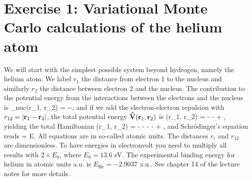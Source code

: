 \section*{Exercise 1: Variational Monte Carlo calculations of the helium atom}

We will start with the simplest possible system beyond hydrogen, namely the helium atom. We label $r_1$ the distance from electron 1 to the nucleus and similarly $r_2$ the distance between electron 2 and the nucleus. The contribution to the potential energy from the interactions between the 
electrons and the nucleus is
\be
   _{nuc}(\vec r_1, \vec r_2) 
   = 
   --,
\ee 
and if we add the electron-electron repulsion with $r_{12}=|{\bf r}_1-{\bf r}_2|$, the total potential energy  ${\bf\widehat{V}}(\mathbf r_1, \mathbf r_2)$ is
\be
 (\vec r_1, \vec r_2)
 =
 - -
 + ,
\ee
yielding the total Hamiltonian
\be
   (\vec r_1, \vec r_2) 
   = 
   - -
   - -
   + ,
\ee
and Schr\"odinger's equation reads
\be
   \psi = E\psi.
\ee
All equations are in so-called atomic units. The distances $r_i$ and $r_{12}$ are dimensionless. To have energies in electronvolt you need to multiply all results with $2\times E_0$, where $E_0=13.6$ eV. The experimental binding energy for helium in atomic units a.u. is $E_{\mathrm{He}}=-2.9037$ a.u.. See chapter 14 of the lecture notes\cite{computationalphysics} for more details.


